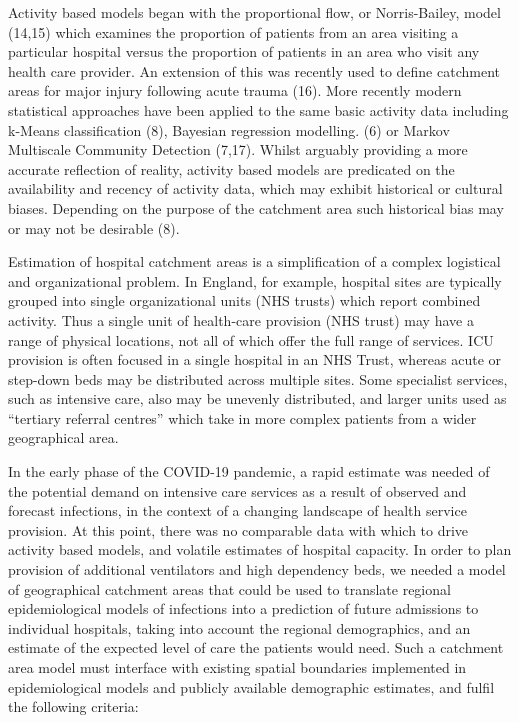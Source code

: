 \documentclass[
]{article}
\begin{document}
Activity based models began with the proportional flow, or
Norris-Bailey, model (14,15) which examines the proportion of patients
from an area visiting a particular hospital versus the proportion of
patients in an area who visit any health care provider. An extension of
this was recently used to define catchment areas for major injury
following acute trauma (16). More recently modern statistical approaches
have been applied to the same basic activity data including k-Means
classification (8), Bayesian regression modelling. (6) or Markov
Multiscale Community Detection (7,17). Whilst arguably providing a more
accurate reflection of reality, activity based models are predicated on
the availability and recency of activity data, which may exhibit
historical or cultural biases. Depending on the purpose of the catchment
area such historical bias may or may not be desirable (8).

Estimation of hospital catchment areas is a simplification of a complex
logistical and organizational problem. In England, for example, hospital
sites are typically grouped into single organizational units (NHS
trusts) which report combined activity. Thus a single unit of
health-care provision (NHS trust) may have a range of physical
locations, not all of which offer the full range of services. ICU
provision is often focused in a single hospital in an NHS Trust, whereas
acute or step-down beds may be distributed across multiple sites. Some
specialist services, such as intensive care, also may be unevenly
distributed, and larger units used as ``tertiary referral centres''
which take in more complex patients from a wider geographical area.

In the early phase of the COVID-19 pandemic, a rapid estimate was needed
of the potential demand on intensive care services as a result of
observed and forecast infections, in the context of a changing landscape
of health service provision. At this point, there was no comparable data
with which to drive activity based models, and volatile estimates of
hospital capacity. In order to plan provision of additional ventilators
and high dependency beds, we needed a model of geographical catchment
areas that could be used to translate regional epidemiological models of
infections into a prediction of future admissions to individual
hospitals, taking into account the regional demographics, and an
estimate of the expected level of care the patients would need. Such a
catchment area model must interface with existing spatial boundaries
implemented in epidemiological models and publicly available demographic
estimates, and fulfil the following criteria:
\end{document}
